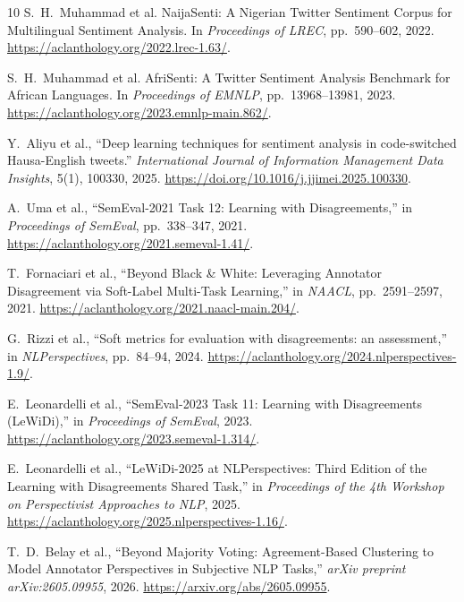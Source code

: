 \documentclass[conference]{IEEEtran}
\begin{document}
\begin{thebibliography}{10}
S.~H.~Muhammad et al.
\newblock NaijaSenti: A Nigerian Twitter Sentiment Corpus for Multilingual
Sentiment Analysis.
\newblock In \emph{Proceedings of LREC}, pp.~590--602, 2022.
\newblock \url{https://aclanthology.org/2022.lrec-1.63/}.

S.~H.~Muhammad et al.
\newblock AfriSenti: A Twitter Sentiment Analysis Benchmark for African Languages.
\newblock In \emph{Proceedings of EMNLP}, pp.~13968--13981, 2023.
\newblock \url{https://aclanthology.org/2023.emnlp-main.862/}.

Y.~Aliyu et al., ``Deep learning techniques for sentiment analysis in code-switched
Hausa-English tweets.''
\newblock \emph{International Journal of Information Management Data Insights},
5(1), 100330, 2025.
\newblock \url{https://doi.org/10.1016/j.jjimei.2025.100330}.

A.~Uma et al., ``SemEval-2021 Task 12: Learning with Disagreements,''
in \emph{Proceedings of SemEval}, pp.~338--347, 2021.
\url{https://aclanthology.org/2021.semeval-1.41/}.

T.~Fornaciari et al., ``Beyond Black \& White: Leveraging Annotator Disagreement
via Soft-Label Multi-Task Learning,'' in \emph{NAACL}, pp.~2591--2597, 2021.
\url{https://aclanthology.org/2021.naacl-main.204/}.

G.~Rizzi et al., ``Soft metrics for evaluation with disagreements: an assessment,''
in \emph{NLPerspectives}, pp.~84--94, 2024.
\url{https://aclanthology.org/2024.nlperspectives-1.9/}.

E.~Leonardelli et al., ``SemEval-2023 Task 11: Learning with Disagreements
(LeWiDi),'' in \emph{Proceedings of SemEval}, 2023.
\url{https://aclanthology.org/2023.semeval-1.314/}.

E.~Leonardelli et al., ``LeWiDi-2025 at NLPerspectives: Third Edition of the
Learning with Disagreements Shared Task,'' in \emph{Proceedings of the 4th
Workshop on Perspectivist Approaches to NLP}, 2025.
\url{https://aclanthology.org/2025.nlperspectives-1.16/}.

T.~D.~Belay et al., ``Beyond Majority Voting: Agreement-Based Clustering to
Model Annotator Perspectives in Subjective NLP Tasks,''
\emph{arXiv preprint arXiv:2605.09955}, 2026.
\url{https://arxiv.org/abs/2605.09955}.


\end{thebibliography}
\end{document}
